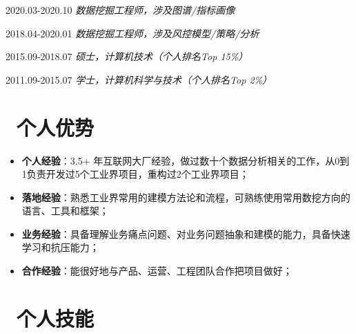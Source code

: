 \documentclass{resume}
\begin{document}
                                  {2020.03-2020.10}
   \faUserMd   \textit{   数据挖掘工程师，涉及图谱/指标画像 }

                                 {2018.04-2020.01}
   \faUserMd   \textit{   数据挖掘工程师，涉及风控模型/策略/分析 }

                                              {2015.09-2018.07}
   \faGraduationCap   \textit{  硕士，计算机技术（个人排名Top 15\%） }

                                  {2011.09-2015.07}
   \faGraduationCap   \textit{  学士，计算机科学与技术（个人排名Top 2\%）}

\medskip










\section{   \faFlag    \  个人优势}

\begin{itemize}  [parsep=0.8ex]
   \item  \textbf{个人经验}：3.5+ 年互联网大厂经验，做过数十个数据分析相关的工作，从0到1负责开发过5个工业界项目，重构过2个工业界项目；

   \item   \textbf{落地经验}：熟悉工业界常用的建模方法论和流程，可熟练使用常用数挖方向的语言、工具和框架；
   
   \item  \textbf{业务经验}：具备理解业务痛点问题、对业务问题抽象和建模的能力，具备快速学习和抗压能力；
  
  \item \textbf{合作经验}：能很好地与产品、运营、工程团队合作把项目做好；
 
\end{itemize}

\medskip










\section{   \faCogs    \  个人技能}
\end{document}
